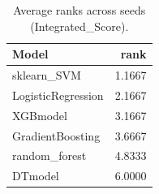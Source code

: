 \begin{table}[t]
\centering
\begin{tabular}{lr}
\toprule
Model & rank \\
\midrule
sklearn_SVM & 1.1667 \\
LogisticRegression & 2.1667 \\
XGBmodel & 3.1667 \\
GradientBoosting & 3.6667 \\
random_forest & 4.8333 \\
DTmodel & 6.0000 \\
\bottomrule
\end{tabular}
\caption{Average ranks across seeds (Integrated_Score).}
\label{tab:avg_rank_Integrated_Score}
\end{table}